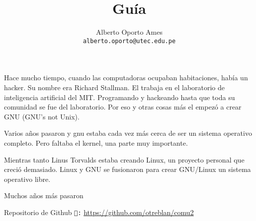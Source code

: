 \documentclass[12pt]{article}
\title{\textbf{Guía}}
\author{
		Alberto Oporto Ames\\
		\texttt{alberto.oporto@utec.edu.pe}
		}
\begin{document}
\maketitle
\thispagestyle{fancy}

Hace mucho tiempo, cuando las computadoras ocupaban habitaciones, había un hacker.
Su nombre era Richard Stallman.
El trabaja en el laboratorio de inteligencia artificial del MIT.
Programando y hackeando hasta que toda su comunidad se fue del laboratorio.
Por eso y otras cosas más el empezó a crear GNU (GNU's not Unix).

Varios años pasaron y gnu estaba cada vez más cerca de ser un sistema operativo completo.
Pero faltaba el kernel, una parte muy importante.

Mientras tanto Linus Torvalds estaba creando Linux, un proyecto personal que creció demasiado.
Linux y GNU se fusionaron para crear GNU/Linux un sistema operativo libre.

Muchos años más pasaron
\gitHash

\vfill
Repositorio de Github \texttt{:} \url{https://github.com/otreblan/comu2}
\end{document}
